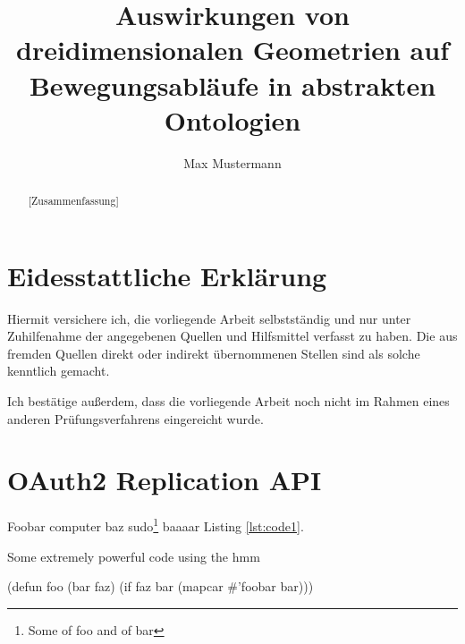 \documentclass{thesis}
\title{Auswirkungen von dreidimensionalen Geometrien auf Bewegungsabläufe in abstrakten Ontologien}
\author{Max Mustermann}
\begin{document}
\maketitle

\chapter*{Eidesstattliche Erklärung}

Hiermit versichere ich, die vorliegende Arbeit selbstständig und nur unter Zuhilfenahme der angegebenen Quellen und Hilfsmittel verfasst zu haben. Die aus fremden Quellen direkt oder indirekt übernommenen Stellen sind als solche kenntlich gemacht.

Ich bestätige außerdem, dass die vorliegende Arbeit noch nicht im Rahmen eines anderen Prüfungsverfahrens eingereicht wurde.

\vspace{3cm}

\dateplaceandsignature{\theauthor}

\cleardoublepage

\begin{abstract}[Zusammenfassung]
  \blindtext
\end{abstract}

\begin{abstract}
\begin{otherlanguage}{english}
\setlength{\parindent}{15pt}
  \noindent\blindtext
\end{otherlanguage}
\end{abstract}

\cleardoublepage

\makelists

\chapter{OAuth2 Replication API}

\blindtext

Foobar \cite{peter_norvig_kunstliche_2012} \gls{computer} baz \cite{mcdermott1991reactive} sudo\footnote{Some of foo and of bar} baaaar Listing \ref{lst:code1}.

\begin{listing}
  \caption{Some extremely powerful code using the \acrshort{hmm}}
  \label{lst:code1}
  \begin{lispcode}
(defun foo (bar faz)
  (if faz
      bar
      (mapcar #'foobar bar)))
  \end{lispcode}
\end{listing}
\end{document}
